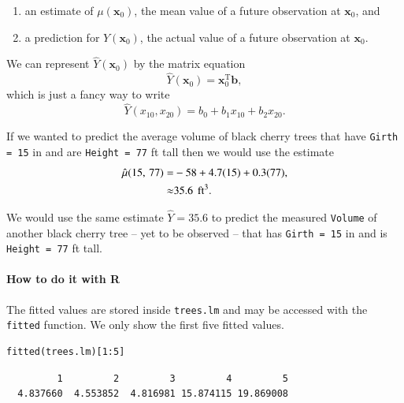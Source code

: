 \documentclass[captions=tableheading]{scrbook}
\begin{document}
\begin{enumerate}
\item an estimate of \(\mu(\mathbf{x}_{0})\), the mean value of a future observation at \(\mathbf{x}_{0}\), and
\item a prediction for \(Y(\mathbf{x}_{0})\), the actual value of a future observation at \(\mathbf{x}_{0}\).
\end{enumerate}

We can represent \(\hat{Y}(\mathbf{x}_{0})\) by the matrix equation
\begin{equation}
\hat{Y}(\mathbf{x}_{0})=\mathbf{x}_{0}^{\mathrm{T}}\mathbf{b},\label{eq:mlr-single-yhat-matrix}
\end{equation}
which is just a fancy way to write
\begin{equation}
\hat{Y}(x_{10},x_{20})=b_{0}+b_{1}x_{10}+b_{2}x_{20}.
\end{equation}
 
\begin{example}
If we wanted to predict the average volume of black cherry trees that have \texttt{Girth = 15} in and are \texttt{Height = 77} ft tall then we would use the estimate 
\begin{alignat*}{1}
\hat{\mu}(15,\,77)= & -58+4.7(15)+0.3(77),\\
\approx & 35.6\mbox{\,\ ft}^{3}.
\end{alignat*}

We would use the same estimate \(\hat{Y}=35.6\) to predict the measured \texttt{Volume} of another black cherry tree -- yet to be observed -- that has \texttt{Girth = 15} in and is \texttt{Height = 77} ft tall.
\end{example}

\paragraph*{How to do it with \textsf{R}}

The fitted values are stored inside \texttt{trees.lm} and may be accessed with the \texttt{fitted} function. We only show the first five fitted values.


\begin{verbatim}
fitted(trees.lm)[1:5]
\end{verbatim}

\begin{verbatim}
         1         2         3         4         5 
  4.837660  4.553852  4.816981 15.874115 19.869008
\end{verbatim}
\end{document}
